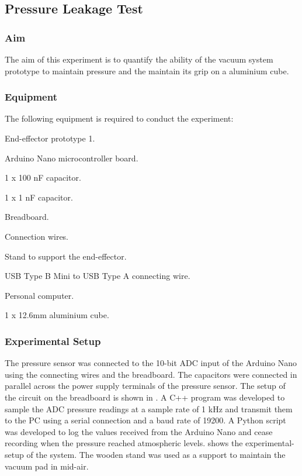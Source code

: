 \subsection{Pressure Leakage Test}

\subsubsection{Aim}

The aim of this experiment is to quantify the ability of the vacuum system prototype to maintain pressure and the maintain its grip on a aluminium cube.

\subsubsection{Equipment}

The following equipment is required to conduct the experiment:

\begin{compactitem}
    \item End-effector prototype 1.
    \item Arduino Nano microcontroller board.
    \item 1 x 100 nF capacitor.
    \item 1 x 1 nF capacitor.
    \item Breadboard.
    \item Connection wires.
    \item Stand to support the end-effector.
    \item USB Type B Mini to USB Type A connecting wire.
    \item Personal computer.
    \item 1 x 12.6mm aluminium cube.
\end{compactitem}

\subsubsection{Experimental Setup}

The pressure sensor was connected to the 10-bit ADC input of the Arduino Nano using the connecting wires and the breadboard. The capacitors were connected in parallel across the power supply terminals of the pressure sensor. The setup of the circuit on the breadboard is shown in . A C++ program was developed to sample the ADC pressure readings at a sample rate of 1 kHz and transmit them to the PC using a serial connection and a baud rate of 19200. A Python script was developed to log the values received from the Arduino Nano and cease recording when the pressure reached atmospheric levels.  shows the experimental-setup of the system. The wooden stand was used as a support to maintain the vacuum pad in mid-air.

